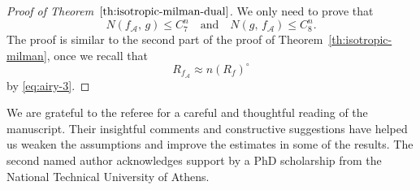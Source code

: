 \documentclass[11pt,leqno]{article}
\theoremstyle{definition}
\theoremstyle{remark}
\numberwithin{equation}{section}
\newcommand{\ls}{\leqslant}
\begin{document}
\begin{proof}[Proof of Theorem~$\ref{th:isotropic-milman-dual}$]We only need to prove that
\begin{equation}\label{eq:M5-M6}N(f_{\mathcal{A}},\, g)\ls C_7^n\quad \text{and}\quad  N(g,\,f_{\mathcal{A}})
\ls C_8^n.\end{equation}
The proof is similar to the second part of the proof of Theorem~\ref{th:isotropic-milman}, once we
recall that $$R_{f_{\mathcal{A}}}\approx n(R_f)^{\circ}$$
by \eqref{eq:airy-3}.
\end{proof}




\bigskip

 We are grateful to the referee for a careful and thoughtful reading of the manuscript. Their insightful comments and 
constructive suggestions have helped us weaken the assumptions and improve the estimates in some of the results. The second named author acknowledges support by a PhD scholarship
from the National Technical University of Athens.

\bigskip 
\end{document}
